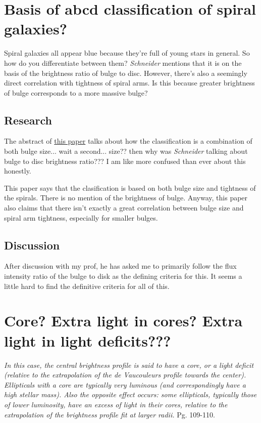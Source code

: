 \documentclass[a4paper,12pt]{article}
\newcommand{\ti}[1]{\textit{#1}}
\begin{document}
\section{Basis of abcd classification of spiral galaxies?}

Spiral galaxies all appear blue because they're full of young stars in general. So how do you differentiate between them? \ti{Schneider} mentions that it is on the basis of the brightness ratio of bulge to disc. However, there's also a seemingly direct correlation with tightness of spiral arms. Is this because greater brightness of bulge corresponds to a more massive bulge?

\subsection*{Research}
The abstract of \href{https://arxiv.org/abs/1904.11436}{this paper} talks about how the classification is a combination of both bulge size... wait a second... size?? then why was \ti{Schneider} talking about bulge to disc brightness ratio??? I am like more confused than ever about this honestly.

\vspace{1em}

This paper says that the clasification is based on both bulge size and tightness of the spirals. There is no mention of the brightness of bulge. Anyway, this paper also claims that there isn't exactly a great correlation between bulge size and spiral arm tightness, especially for smaller bulges.

\subsection*{Discussion}
After discussion with my prof, he has asked me to primarily follow the flux intensity ratio of the bulge to disk as the defining criteria for this. It seems a little hard to find the definitive criteria for all of this.


\section{Core? Extra light in cores? Extra light in light deficits???}

\ti{In this case, the central brightness profile is said to have a core, or a light deficit (relative to the extrapolation of the de Vaucouleurs profile towards the center). Ellipticals with a core are typically very luminous (and correspondingly have a high stellar mass). Also the opposite effect occurs: some ellipticals, typically those of lower luminosity, have an excess of light in their cores, relative to the extrapolation of the brightness profile fit at larger radii.} Pg. 109-110.
\end{document}
